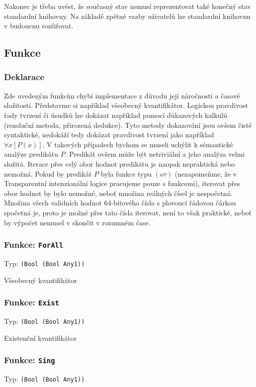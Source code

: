 Nakonec je třeba uvést, že současný stav nemusí reprezentovat také konečný stav standardní knihovny.
Na základě zpětné vazby uživatelů lze standardní knihovnu v budoucnu rozšiřovat.

\subsection{Funkce}

\subsubsection{Deklarace}

Zde uvedeným funkcím chybí implementace z důvodu její náročnosti a časové složitosti. Představme si
například všeobecný kvantifikátor. Logickou pravdivost řady tvrzení či úsudků lze dokázat například
pomocí důkazových kalkulů (rezoluční metoda, přirozená dedukce). Tyto metody dokazování jsou ovšem
čistě syntaktické, nedokáží tedy dokázat pravdivost tvrzení jako například $\forall x[P(x)]$. V takových
případech bychom se museli uchýlit k sémantické analýze predikátu $P$.
Predikát ovšem může být netriviální a jeho analýza velmi složitá. Iterace přes celý obor hodnot
predikátu je naopak nepraktická nebo nemožná. Pokud by predikát $P$ byla funkce typu $(o\tau)$
(nezapomeňme, že v Transparentní intenzionální logice pracujeme pouze s funkcemi), iterovat přes
obor hodnot by bylo nemožné, neboť množina reálných čísel je nespočetná. Množina všech validních
hodnot 64-bitového čísla s plovoucí řádovou čárkou spočetná je, proto je možné přes tato čísla
iterovat, není to však praktické, neboť by výpočet nemusel v skončit v rozumném čase.

\subsubsection*{Funkce: \lstinline|ForAll|}
Typ: \lstinline|(Bool (Bool Any1))|

Všeobecný kvantifikátor

\subsubsection*{Funkce: \lstinline|Exist|}
Typ: \lstinline|(Bool (Bool Any1))|

Existenční kvantifikátor

\subsubsection*{Funkce: \lstinline|Sing|}
Typ: \lstinline|(Bool (Bool Any1))|

